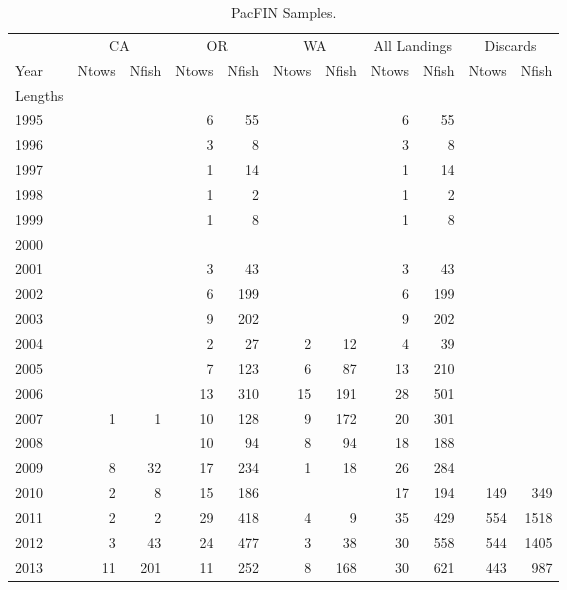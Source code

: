 \documentclass[12pt,]{article}
\begin{document}
\FloatBarrier
\newpage

\begin{table}[ht]
\centering
\caption{PacFIN Samples.} 
\label{tab:PacFIN_Samples}
\begin{tabular}{lrrrrrrrrrr}
  \hline
   \multicolumn{1}{c}{} & \multicolumn{2}{c}{CA} & \multicolumn{2}{c}{OR} & \multicolumn{2}{c}{WA} & \multicolumn{2}{c}{All Landings} & \multicolumn{2}{c}{Discards} \\  \cmidrule(lr){2-3} \cmidrule(lr){4-5} \cmidrule(lr){6-7} \cmidrule(lr){8-9} \cmidrule(lr){10-11}
  Year & Ntows & Nfish & Ntows & Nfish & Ntows & Nfish & Ntows & Nfish & Ntows & Nfish \\ 
  \hline
Lengths &  &  &  &  &  &  &  &  &  &  \\ 
  1995 &  &  &   6 &  55 &  &  &   6 &  55 &  &  \\ 
  1996 &  &  &   3 &   8 &  &  &   3 &   8 &  &  \\ 
  1997 &  &  &   1 &  14 &  &  &   1 &  14 &  &  \\ 
  1998 &  &  &   1 &   2 &  &  &   1 &   2 &  &  \\ 
  1999 &  &  &   1 &   8 &  &  &   1 &   8 &  &  \\ 
  2000 &  &  &  &  &  &  &  &  &  &  \\ 
  2001 &  &  &   3 &  43 &  &  &   3 &  43 &  &  \\ 
  2002 &  &  &   6 & 199 &  &  &   6 & 199 &  &  \\ 
  2003 &  &  &   9 & 202 &  &  &   9 & 202 &  &  \\ 
  2004 &  &  &   2 &  27 &   2 &  12 &   4 &  39 &  &  \\ 
  2005 &  &  &   7 & 123 &   6 &  87 &  13 & 210 &  &  \\ 
  2006 &  &  &  13 & 310 &  15 & 191 &  28 & 501 &  &  \\ 
  2007 &   1 &   1 &  10 & 128 &   9 & 172 &  20 & 301 &  &  \\ 
  2008 &  &  &  10 &  94 &   8 &  94 &  18 & 188 &  &  \\ 
  2009 &   8 &  32 &  17 & 234 &   1 &  18 &  26 & 284 &  &  \\ 
  2010 &   2 &   8 &  15 & 186 &  &  &  17 & 194 & 149 & 349 \\ 
  2011 &   2 &   2 &  29 & 418 &   4 &   9 &  35 & 429 & 554 & 1518 \\ 
  2012 &   3 &  43 &  24 & 477 &   3 &  38 &  30 & 558 & 544 & 1405 \\ 
  2013 &  11 & 201 &  11 & 252 &   8 & 168 &  30 & 621 & 443 & 987 \\ 

\end{tabular}
\end{table}
\end{document}
